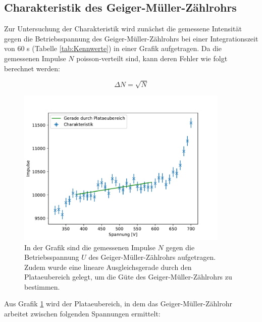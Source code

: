 \documentclass[titlepage = firstcover]{scrartcl}
\begin{document}
        \subsection{Charakteristik des Geiger-Müller-Zählrohrs}
                Zur Untersuchung der Charakteristik wird zunächst die gemessene Intensität gegen die Betriebsspannung des Geiger-Müller-Zählrohrs bei einer Integrationszeit von 60 s (Tabelle
                \ref{tab:Kennwerte}) in einer Grafik aufgetragen. Da die gemessenen Impulse $N$ poisson-verteilt sind, kann deren Fehler wie folgt berechnet werden:

                \begin{equation*}
                    \Delta N = \sqrt{N}
                \end{equation*}

                \FloatBarrier

                 \begin{figure}[h]
                   \centering
                   \includegraphics[width = 0.9\textwidth]{Charakteristik.pdf}
                   \caption{In der Grafik sind die gemessenen Impulse $N$ gegen die Betriebsspannung $U$ des Geiger-Müller-Zählrohrs aufgetragen. Zudem wurde eine lineare Ausgleichsgerade durch den Plataeubereich gelegt, um die Güte des Geiger-Müller-Zählrohrs zu bestimmen.}
                   \label{fig:Charakteristik}
                 \end{figure}
             
                \FloatBarrier
                \noindent
                Aus Grafik \ref{fig:Charakteristik} wird der Plataeubereich, in dem das Geiger-Müller-Zählrohr arbeitet zwischen folgenden Spannungen ermittelt:
\end{document}
